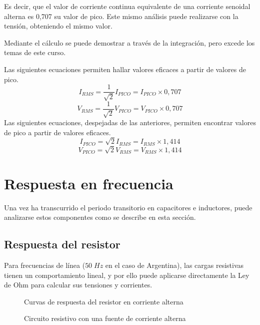 Es decir, que el valor de corriente continua equivalente de una corriente senoidal alterna es 0,707 su valor de pico. Este mismo análisis puede realizarse con la tensión, obteniendo el mismo valor.

Mediante el cálculo se puede demostrar a través de la integración, pero excede los temas de este curso.

\begin{conclusiones}
	Las siguientes ecuaciones permiten hallar valores eficaces a partir de valores de pico.
	\begin{equation}
		I_{RMS} = \frac{1}{\sqrt{2}}I_{PICO}=I_{PICO}\times 0,707
	\end{equation}
	\begin{equation}
		V_{RMS} = \frac{1}{\sqrt{2}}V_{PICO}=V_{PICO}\times 0,707
	\end{equation}
	Las siguientes ecuaciones, despejadas de las anteriores, permiten encontrar valores de pico a partir de valores eficaces.
	\begin{equation}
		I_{PICO} = \sqrt{2}I_{RMS}=I_{RMS}\times 1,414
	\end{equation}
	\begin{equation}
		V_{PICO} = \sqrt{2}V_{RMS}=V_{RMS}\times 1,414
	\end{equation}
\end{conclusiones}

\section{Respuesta en frecuencia}

Una vez ha transcurrido el periodo transitorio en capacitores e inductores, puede analizarse estos componentes como se describe en esta sección.

\subsection{Respuesta del resistor}

Para frecuencias de línea ($50\; Hz$ en el caso de Argentina), las cargas resistivas tienen un comportamiento lineal, y por ello puede aplicarse directamente la Ley de Ohm para calcular sus tensiones y corrientes.

\begin{figure}[htbp]
  \caption{Curvas de respuesta del resistor en corriente alterna}
  \label{fig:respuesta_resistor_curvas}
\end{figure}
\begin{figure}[htbp]
  \caption{Circuito resistivo con una fuente de corriente alterna}
  \label{fig:respuesta_resistor_circuito}
\end{figure}

